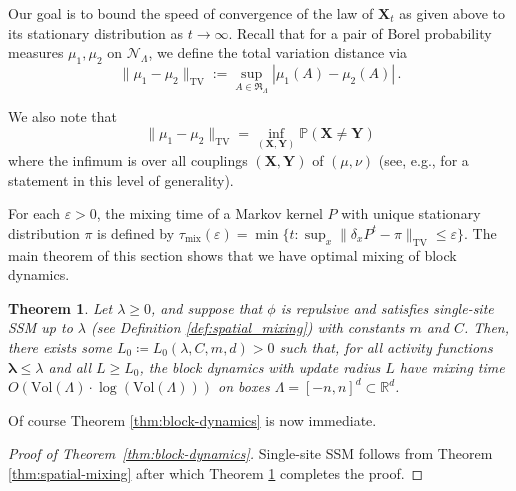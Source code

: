 \documentclass[10pt]{amsart}
\newtheorem{theorem}{Theorem}[section]
\theoremstyle{definition}
\theoremstyle{remark}
\def\eps{{\varepsilon}}
\newcommand{\pointsets}{\mathcal{N}}
\newcommand{\events}{\mathfrak{R}}
\newcommand{\bX}{\mathbf{X}}
\newcommand{\bY}{\mathbf{Y}}
\renewcommand{\P}{\mathbb{P}}
\newcommand{\R}{\mathbb{R}}
\newcommand{\region}{\Lambda}
\newcommand{\potential}{\phi}
\newcommand{\activity}{\lambda}
\newcommand{\activities}{\pmb{\lambda}}
\newcommand{\vol}{\mathrm{Vol}}
\begin{document}
	Our goal is to bound the speed of convergence of the law of $\bX_t$ as given above to its stationary distribution as $t \to \infty$.  
	Recall that for a pair of Borel probability measures $\mu_1,\mu_2$ on $\pointsets_{\region}$, we define the total variation distance via $$\| \mu_1 - \mu_2\|_{\mathrm{TV}} := \sup_{A \in \events_{\region}} |\mu_1(A) - \mu_2(A)|\,.$$
	
	We also note that  \begin{equation}\label{eq:TV-coupling}
		\|\mu_1 - \mu_2\|_{\mathrm{TV}} = \inf_{(\bX,\bY)} \P(\bX \neq \bY)
	\end{equation}
	where the infimum is over all couplings $(\bX,\bY)$ of $(\mu,\nu)$ (see, e.g., \cite[Chapter 1.5]{lindvall1992lectures} for a statement in this level of generality).
	
	For each $\eps > 0$, the mixing time of a Markov kernel $P$ with unique stationary distribution $\pi$ is defined by $\tau_{\mathrm{mix}}(\eps) = \min\{t : \sup_{x}\| \delta_x P^t - \pi\|_{\mathrm{TV}} \leq \eps\}.$  The main theorem of this section shows that we have optimal mixing of block dynamics.
	
	\begin{theorem}\label{th:mixing-block-dynamics}
		Let $\activity \ge 0$, and suppose that $\potential$ is repulsive and satisfies single-site SSM up to $\activity$ (see Definition \ref{def:spatial_mixing}) with constants $m$ and $C$. 
		Then, there exists some $L_0 \coloneqq L_0(\activity, C, m, d) > 0$ such that, for all activity functions $\activities \le \activity$ and all $L \ge L_0$, the block dynamics with update radius $L$ have mixing time $O(\vol(\region) \cdot \log(\vol(\region)))$ on boxes $\region = [-n, n]^d \subset \R^d$.
	\end{theorem}
	
	Of course Theorem \ref{thm:block-dynamics} is now immediate.
	
	\begin{proof}[Proof of Theorem~\ref{thm:block-dynamics}]
		Single-site SSM follows from Theorem \ref{thm:spatial-mixing} after which Theorem \ref{th:mixing-block-dynamics} completes the proof.
	\end{proof}
	
\end{document}
